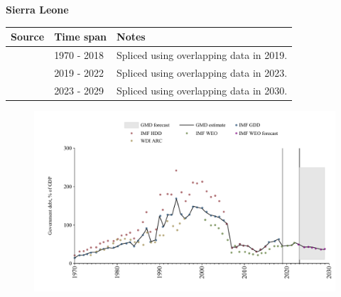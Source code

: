 \documentclass[12pt,a4paper,landscape]{article}
\begin{document}
\begin{adjustbox}{max totalsize={\paperwidth}{\paperheight},center}
\begin{minipage}[t][\textheight][t]{\textwidth}
\vspace*{0.5cm}
{}
\begin{center}
{\Large\bfseries Sierra Leone}
\end{center}
\vspace{0.5cm}
\begin{table}[H]
\centering
\small
\begin{tabular}{|l|l|l|}
\hline
\textbf{Source} & \textbf{Time span} & \textbf{Notes} \\
\hline
\rowcolor{white}\cite{IMF_GDD}& 1970 - 2018 &Spliced using overlapping data in 2019.\\
\rowcolor{lightgray}\cite{IMF_WEO}& 2019 - 2022 &Spliced using overlapping data in 2023.\\
\rowcolor{white}\cite{IMF_WEO_forecast}& 2023 - 2029 &Spliced using overlapping data in 2030.\\
\hline
\end{tabular}
\end{table}
\begin{figure}[H]
\centering
\includegraphics[width=\textwidth,height=0.6\textheight,keepaspectratio]{graphs/SLE_govdebt_GDP.pdf}
\end{figure}
\end{minipage}
\end{adjustbox}
\end{document}
